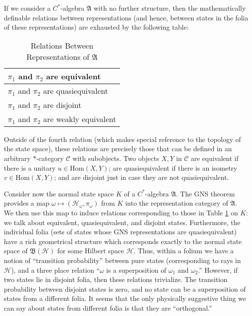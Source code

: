 \documentclass[11pt]{article}
\newcommand{\alg}[1]{\mathfrak{#1}}
\newcommand{\bh}{\mathfrak{B}(\mathcal{H})}
\theoremstyle{definition}
\theoremstyle{definition}
\theoremstyle{remark}
\def\2#1{{\mathcal #1}}
\def\al#1{{\mathfrak #1}}
\def\om{\omega} \def\Om{\Omega} \def\dd{\partial} \def\D{\Delta}
\newcommand{\Hom}{\mathrm{Hom}}
\begin{document}
If we consider a $C^*$-algebra $\alg{A}$ with no
further structure, then the mathematically definable
relations between representations (and hence, between
states in the folia of these representations) are
exhausted by the following table: 
\begin{table}[h] \begin{center}
\begin{tabular}{||l||}
  \hline \hline $\pi _1$ and $\pi _2$ are equivalent   \\ 
  \hline $\pi _1$ and $\pi _2$ are quasiequivalent  \\
  \hline $\pi _1$ and $\pi _2$ are disjoint   \\
  \hline $\pi _1$ and $\pi _2$ are weakly equivalent  \\
  \hline \hline \end{tabular} \caption{Relations Between Representations
  of $\alg{A}$} \label{coarse} \end{center} \end{table}

\noindent Outside of the fourth relation (which makes
special reference to the topology of the state space),
these relations are precisely those that can be defined
in an arbitrary $*$-category $\2C$ with subobjects.
Two objects $X,Y$ in $\2C$ are equivalent if there is a
unitary $u\in \Hom (X,Y)$; are quasiequivalent if there
is an isometry $v\in \Hom (X,Y)$; and are disjoint just
in case they are not quasiequivalent.

Consider now the normal state space $K$ of a $C^*$-algebra $\al A$.
The GNS theorem provides a map $\om \mapsto (\2H _\om ,\pi _\om )$
from $K$ into the representation category of $\al A$.  We then use
this map to induce relations corresponding to those in Table
\ref{coarse} on $K$: we talk about equivalent, quasiequivalent, and
disjoint states.  Furthermore, the individual folia (sets of states
whose GNS representations are quasiequivalent) have a rich geometrical
structure which corresponds exactly to the normal state space of $\bh$
for some Hilbert space $\2H$.  Thus, within a folium we have a notion
of ``transition probability'' between pure states (corresponding to
rays in $\2H$), and a three place relation ``$\om$ is a superposition
of $\om _1$ and $\om _2$.''  However, if two states lie in disjoint
folia, then these relations trivialize.  The transition probability
between disjoint states is zero, and no state can be a superposition
of states from a different folia.  It seems that the only physically
suggestive thing we can say about states from different folia is that
they are ``orthogonal.''
\end{document}
